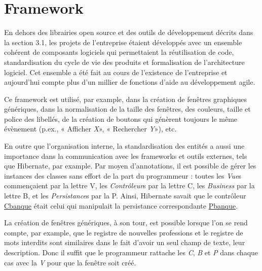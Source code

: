 \section{Framework}

En dehors des librairies open source et des outils de développement décrits dans la section 3.1, les projets de l'entreprise étaient développés avec un ensemble cohérent de composants logiciels qui permettaient la réutilisation de code, standardisation du cycle de vie des produits et formalisation de l'architecture logiciel. Cet ensemble a été fait au cours de l'existence de l'entreprise et aujourd'hui compte plus d'un millier de fonctions d'aide au développement agile.

Ce framework est utilisé, par example, dans la création de fenêtres graphiques génériques, dans la normalisation de la taille des fenêtres, des couleurs, taille et police des libellés, de la création de boutons qui génèrent toujours le même évènement (p.ex., « Afficher \emph{X}», « Rechercher \emph{Y}»), etc. 

En outre que l'organisation interne, la standardisation des entités a aussi une importance dans la communication avec les frameworks et outils externes, tels que Hibernate, par example. Par moyen d'annotations, il est possible de gérer les instances des classes sans effort de la part du programmeur : toutes les \textit{Vue}s commençaient par la lettre V, les \textit{Contrôleur}s par la lettre C, les \textit{Business} par la lettre B, et les \textit{Persistance}s par la P. Ainsi, Hibernate savait que le contrôleur \underline{Cbanque} était celui qui manipulait la persistance correspondante \underline{Pbanque}.

La création de fenêtres génériques, à son tour, est possible lorsque l'on se rend compte, par example, que le registre de nouvelles professions et le registre de mots interdits sont similaires dans le fait d'avoir un seul champ de texte, leur description. Donc il suffit que le programmeur rattache les \textit{C}, \textit{B} et \textit{P} dans chaque cas avec la \textit{V} pour que la fenêtre soit créé.